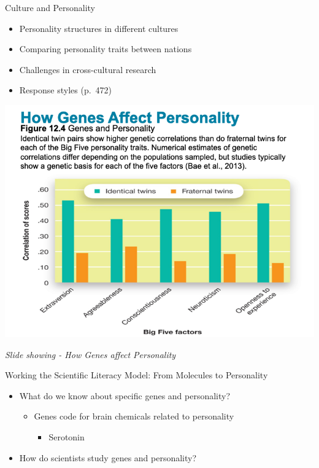 \documentclass[
]{book}
\providecommand{\tightlist}{%
  \setlength{\itemsep}{0pt}\setlength{\parskip}{0pt}}
\begin{document}
\begin{reflect}
Culture and Personality

\begin{itemize}
\tightlist
\item
  Personality structures in different cultures\\
\item
  Comparing personality traits between nations\\
\item
  Challenges in cross-cultural research\\
\item
  Response styles (p.~472)
\end{itemize}

\includegraphics{assets/unit_5/slide_20.png}

\emph{Slide showing - How Genes affect Personality}

Working the Scientific Literacy Model: From Molecules to Personality

\begin{itemize}
\tightlist
\item
  What do we know about specific genes and personality?

  \begin{itemize}
  \tightlist
  \item
    Genes code for brain chemicals related to personality

    \begin{itemize}
    \tightlist
    \item
      Serotonin\\
    \end{itemize}
  \end{itemize}
\item
  How do scientists study genes and personality?
\end{itemize}


\end{reflect}
\end{document}

